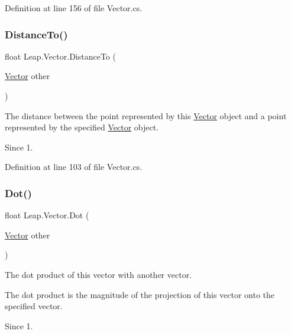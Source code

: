 Definition at line 156 of file Vector.\+cs.

\mbox{\label{struct_leap_1_1_vector_a9a192946523c91fc5aec3541cc09b762}} 
\subsubsection{\texorpdfstring{DistanceTo()}{DistanceTo()}}
{\footnotesize\ttfamily float Leap.\+Vector.\+Distance\+To (\begin{DoxyParamCaption}\item[{\mbox{\hyperlink{struct_leap_1_1_vector}{Vector}}}]{other }\end{DoxyParamCaption})}



The distance between the point represented by this \mbox{\hyperlink{struct_leap_1_1_vector}{Vector}} object and a point represented by the specified \mbox{\hyperlink{struct_leap_1_1_vector}{Vector}} object. 

\begin{DoxySince}{Since}
1. 
\end{DoxySince}


Definition at line 103 of file Vector.\+cs.

\mbox{\label{struct_leap_1_1_vector_a9177e8852525449bc0817f77de9a9804}} 
\subsubsection{\texorpdfstring{Dot()}{Dot()}}
{\footnotesize\ttfamily float Leap.\+Vector.\+Dot (\begin{DoxyParamCaption}\item[{\mbox{\hyperlink{struct_leap_1_1_vector}{Vector}}}]{other }\end{DoxyParamCaption})}



The dot product of this vector with another vector. 

The dot product is the magnitude of the projection of this vector onto the specified vector. \begin{DoxySince}{Since}
1. 
\end{DoxySince}


